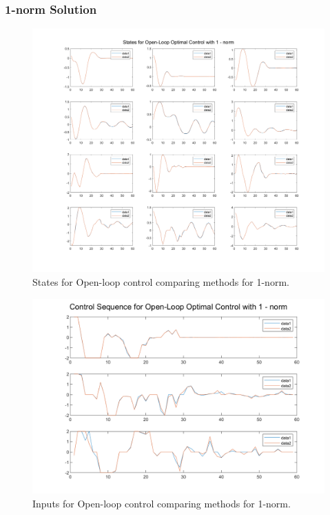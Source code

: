 \documentclass[letter]{article}
\begin{document}
\subsubsection{1-norm Solution}
\begin{figure}[h]
	\centering
	\includegraphics[width=1\linewidth]{fig/pblm1_1n_x}
	\caption{States for Open-loop control comparing methods for 1-norm.}
	\label{fig:pblm11nx}
\end{figure}\newpage

\begin{figure}[h]
	\centering
	\includegraphics[width=1\linewidth]{fig/pblm1_1n_u}
	\caption{Inputs for Open-loop control comparing methods for 1-norm.}
	\label{fig:pblm11nu}
\end{figure}
\end{document}
